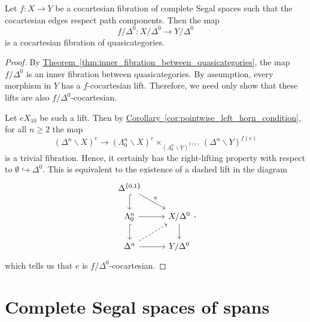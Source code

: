 \documentclass[main.tex]{subfiles}
\begin{document}
\begin{corollary}
  \label{cor:cocart_fib_between_css_gives_cocart_fib_of_quasicats}
  Let $f\colon X \to Y$ be a cocartesian fibration of complete Segal spaces such that the cocartesian edges respect path components. Then the map
  \begin{equation*}
    f/\Delta^{0}\colon X/\Delta^{0} \to Y/\Delta^{0}
  \end{equation*}
  is a cocartesian fibration of quasicategories.
\end{corollary}
\begin{proof}
  By \hyperref[thm:inner_fibration_between_quasicategories]{Theorem~\ref*{thm:inner_fibration_between_quasicategories}}, the map $f/\Delta^{0}$ is an inner fibration between quasicategories. By assumption, every morphism in $Y$ has a $f$-cocartesian lift. Therefore, we need only show that these lifts are also $f / \Delta^{0}$-cocartesian.

  Let $e X_{10}$ be such a lift. Then by \hyperref[cor:pointwise_left_horn_condition]{Corollary~\ref*{cor:pointwise_left_horn_condition}}, for all $n \geq 2$ the map
  \begin{equation*}
    (\Delta^{n} \backslash X)^{e} \to (\Lambda^{n}_{0} \backslash X)^{e} \times_{(\Lambda^{n}_{0} \backslash Y)^{f(e)}} (\Delta^{n} \backslash Y)^{f(e)}
  \end{equation*}
  is a trivial fibration. Hence, it certainly has the right-lifting property with respect to $\emptyset \hookrightarrow \Delta^{0}$. This is equivalent to the existence of a dashed lift in the diagram
  \begin{equation*}
    \begin{tikzcd}
      \Delta^{\{0, 1\}}
      \arrow[d, hook]
      \arrow[dr, "e"]
      \\
      \Lambda^{n}_{0}
      \arrow[r]
      \arrow[d, hook]
      & X / \Delta^{0}
      \arrow[d]
      \\
      \Delta^{n}
      \arrow[r]
      \arrow[ur, dashed]
      & Y / \Delta^{0}
    \end{tikzcd},
  \end{equation*}
  which tells us that $e$ is $f / \Delta^{0}$-cocartesian.
\end{proof}

\section{Complete Segal spaces of spans}
\label{sec:complete_segal_spaces_of_spans}
\end{document}
